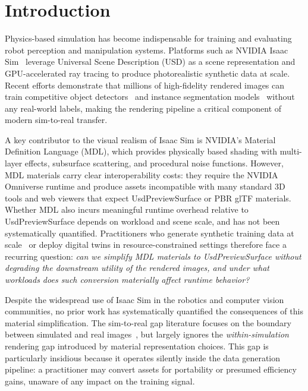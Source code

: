 \section{Introduction}
\label{sec:introduction}

Physics-based simulation has become indispensable for training and evaluating
robot perception and manipulation systems. Platforms such as NVIDIA Isaac
Sim~\cite{Mittal2025Isaac,Mittal2023Orbit,Makoviychuk2021Isaac} leverage
Universal Scene Description (USD) as a scene representation and GPU-accelerated
ray tracing to produce photorealistic synthetic data at scale. Recent efforts
demonstrate that millions of high-fidelity rendered images can train competitive
object detectors~\cite{Singh2025Synthetica} and instance segmentation
models~\cite{Ng2023SynTable} without any real-world labels, making the
rendering pipeline a critical component of modern sim-to-real transfer.

A key contributor to the visual realism of Isaac Sim is NVIDIA's Material
Definition Language (MDL), which provides physically based shading with
multi-layer effects, subsurface scattering, and procedural noise functions.
However, MDL materials carry clear interoperability costs: they require the
NVIDIA Omniverse runtime and produce assets incompatible with many standard 3D
tools and web viewers that expect UsdPreviewSurface or PBR glTF materials.
Whether MDL also incurs meaningful runtime overhead relative to
UsdPreviewSurface depends on workload and scene scale, and has not been
systematically quantified. Practitioners who generate synthetic training data
at scale~\cite{Singh2025Synthetica,Ng2023SynTable} or deploy digital twins in
resource-constrained settings therefore face a recurring question:
\emph{can we simplify MDL materials to UsdPreviewSurface without degrading the
downstream utility of the rendered images, and under what workloads does such
conversion materially affect runtime behavior?}

Despite the widespread use of Isaac Sim in the robotics and computer vision
communities, no prior work has systematically quantified the consequences of
this material simplification. The sim-to-real gap literature focuses on
the boundary between simulated and real images~\cite{Tobin2017Domain,Tremblay2018Training,Zakharov2022Photo}, but largely ignores the
\emph{within-simulation} rendering gap introduced by material representation
choices. This gap is particularly insidious because it operates silently inside
the data generation pipeline: a practitioner may convert assets for portability
or presumed efficiency gains, unaware of any impact on the training signal.

